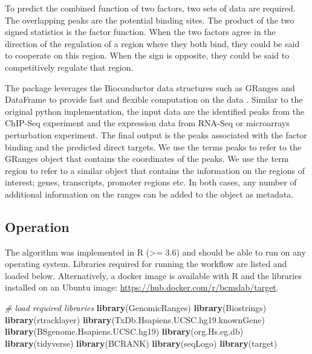 \documentclass[9pt,a4paper,]{extarticle}
\newenvironment{Shaded}{\begin{snugshade}}{\end{snugshade}}
\newcommand{\CommentTok}[1]{\textcolor[rgb]{0.56,0.35,0.01}{\textit{#1}}}
\newcommand{\KeywordTok}[1]{\textcolor[rgb]{0.13,0.29,0.53}{\textbf{#1}}}
\newcommand{\NormalTok}[1]{#1}
\begin{document}
To predict the combined function of two factors, two sets of data are required. The overlapping peaks are the potential binding sites. The product of the two signed statistics is the factor function. When the two factors agree in the direction of the regulation of a region where they both bind, they could be said to cooperate on this region. When the sign is opposite, they could be said to competitively regulate that region.

The package leverages the Bioconductor data structures such as GRanges and DataFrame to provide fast and flexible computation on the data \citet{Huber2015}. Similar to the original python implementation, the input data are the identified peaks from the ChIP-Seq experiment and the expression data from RNA-Seq or microarrays perturbation experiment. The final output is the peaks associated with the factor binding and the predicted direct targets. We use the terms peaks to refer to the GRanges object that contains the coordinates of the peaks. We use the term region to refer to a similar object that contains the information on the regions of interest; genes, transcripts, promoter regions etc. In both cases, any number of additional information on the ranges can be added to the object as metadata.

\hypertarget{operation}{%
\subsection{Operation}\label{operation}}

The algorithm was implemented in R (\textgreater= 3.6) and should be able to run on any operating system. Libraries required for running the workflow are listed and loaded below. Alternatively, a docker image is available with R and the libraries installed on an Ubuntu image: \url{https://hub.docker.com/r/bcmslab/target}.

\begin{Shaded}
\begin{Highlighting}[]
\CommentTok{# load required libraries}
\KeywordTok{library}\NormalTok{(GenomicRanges)}
\KeywordTok{library}\NormalTok{(Biostrings)}
\KeywordTok{library}\NormalTok{(rtracklayer)}
\KeywordTok{library}\NormalTok{(TxDb.Hsapiens.UCSC.hg19.knownGene)}
\KeywordTok{library}\NormalTok{(BSgenome.Hsapiens.UCSC.hg19)}
\KeywordTok{library}\NormalTok{(org.Hs.eg.db)}
\KeywordTok{library}\NormalTok{(tidyverse)}
\KeywordTok{library}\NormalTok{(BCRANK)}
\KeywordTok{library}\NormalTok{(seqLogo)}
\KeywordTok{library}\NormalTok{(target)}
\end{Highlighting}
\end{Shaded}
\end{document}
